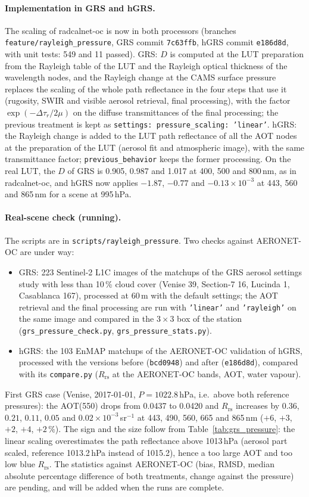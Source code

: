 \documentclass[11pt,a4paper]{article}
\newcommand{\Rrs}{R_\mathrm{rs}}
\newcommand{\code}[1]{\texttt{#1}}
\begin{document}
\paragraph{Implementation in GRS and hGRS.} The scaling of radcalnet-oc is now in both processors (branches
\code{feature/rayleigh\_pressure}, GRS commit \code{7c63ffb}, hGRS commit \code{e186d8d}, with unit tests: 549 and 11
passed). GRS: $D$ is computed at the LUT preparation from the Rayleigh table of the LUT and the Rayleigh optical
thickness of the wavelength nodes, and the Rayleigh change at the CAMS surface pressure replaces the scaling of the whole
path reflectance in the four steps that use it (rugosity, SWIR and visible aerosol retrieval, final processing), with
the factor $\exp(-\Delta\tau_r/2\mu)$ on the diffuse transmittances of the final processing; the previous treatment is kept
as \code{settings: pressure\_scaling: 'linear'}. hGRS: the Rayleigh change is added to the LUT path reflectance of all
the AOT nodes at the preparation of the LUT (aerosol fit and atmospheric image), with the same transmittance factor;
\code{previous\_behavior} keeps the former processing. On the real LUT, the $D$ of GRS is 0.905, 0.987 and 1.017 at 400,
500 and 800\,nm, as in radcalnet-oc, and hGRS now applies $-1.87$, $-0.77$ and $-0.13\times10^{-3}$ at 443, 560 and
865\,nm for a scene at 995\,hPa.

\paragraph{Real-scene check (running).} The scripts are in \code{scripts/rayleigh\_pressure}. Two checks against
AERONET-OC are under way:
\begin{itemize}
\item GRS: 223 Sentinel-2 L1C images of the matchups of the GRS aerosol settings study with less than 10\,\% cloud
  cover (Venise 39, Section-7 16, Lucinda 1, Casablanca 167), processed at 60\,m with the default settings; the AOT
  retrieval and the final processing are run with \code{'linear'} and \code{'rayleigh'} on the same image and compared
  in the $3\times3$ box of the station (\code{grs\_pressure\_check.py}, \code{grs\_pressure\_stats.py}).
\item hGRS: the 103 EnMAP matchups of the AERONET-OC validation of hGRS, processed with the versions before
  (\code{bcd0948}) and after (\code{e186d8d}), compared with its \code{compare.py} ($\Rrs$ at the AERONET-OC bands, AOT,
  water vapour).
\end{itemize}
First GRS case (Venise, 2017-01-01, $P = 1022.8$\,hPa, i.e.\ above both reference pressures): the AOT(550) drops from
0.0437 to 0.0420 and $\Rrs$ increases by $0.36$, $0.21$, $0.11$, $0.05$ and $0.02\times10^{-3}$\,sr$^{-1}$ at 443, 490,
560, 665 and 865\,nm ($+6$, $+3$, $+2$, $+4$, $+2\,\%$). The sign and the size follow from Table~\ref{tab:grs_pressure}:
the linear scaling overestimates the path reflectance above 1013\,hPa (aerosol part scaled, reference 1013.2\,hPa
instead of 1015.2), hence a too large AOT and too low blue $\Rrs$. The statistics against AERONET-OC (bias, RMSD,
median absolute percentage difference of both treatments, change against the pressure) are pending, and will be
added when the runs are complete.
\end{document}

